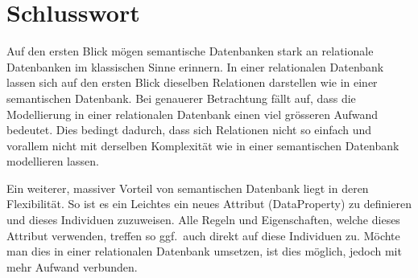 \chapter{Schlusswort}
\label{chap:schlusswort}


Auf den ersten Blick mögen semantische Datenbanken stark an relationale Datenbanken im klassischen Sinne erinnern. In einer relationalen Datenbank lassen sich auf den ersten Blick dieselben Relationen darstellen wie in einer semantischen Datenbank. Bei genauerer Betrachtung fällt auf, dass die Modellierung in einer relationalen Datenbank einen viel grösseren Aufwand bedeutet. Dies bedingt dadurch, dass sich Relationen nicht so einfach und vorallem nicht mit derselben Komplexität wie in einer semantischen Datenbank modellieren lassen. %

Ein weiterer, massiver Vorteil von semantischen Datenbank liegt in deren Flexibilität. So ist es ein Leichtes ein neues Attribut (DataProperty) zu definieren und dieses Individuen zuzuweisen. Alle Regeln und Eigenschaften, welche dieses Attribut verwenden, treffen so ggf.\ auch direkt auf diese Individuen zu. Möchte man dies in einer relationalen Datenbank umsetzen, ist dies möglich, jedoch mit mehr Aufwand verbunden.
